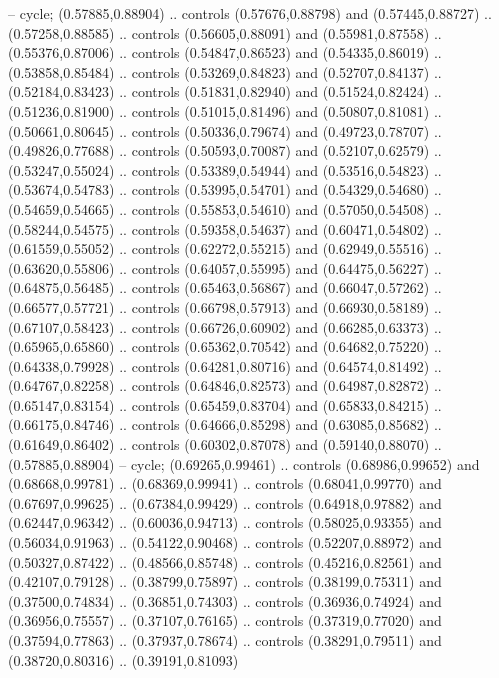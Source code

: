     -- cycle;
   (0.57885,0.88904)
    .. controls (0.57676,0.88798) and (0.57445,0.88727) .. (0.57258,0.88585)
    .. controls (0.56605,0.88091) and (0.55981,0.87558) .. (0.55376,0.87006)
    .. controls (0.54847,0.86523) and (0.54335,0.86019) .. (0.53858,0.85484)
    .. controls (0.53269,0.84823) and (0.52707,0.84137) .. (0.52184,0.83423)
    .. controls (0.51831,0.82940) and (0.51524,0.82424) .. (0.51236,0.81900)
    .. controls (0.51015,0.81496) and (0.50807,0.81081) .. (0.50661,0.80645)
    .. controls (0.50336,0.79674) and (0.49723,0.78707) .. (0.49826,0.77688)
    .. controls (0.50593,0.70087) and (0.52107,0.62579) .. (0.53247,0.55024)
    .. controls (0.53389,0.54944) and (0.53516,0.54823) .. (0.53674,0.54783)
    .. controls (0.53995,0.54701) and (0.54329,0.54680) .. (0.54659,0.54665)
    .. controls (0.55853,0.54610) and (0.57050,0.54508) .. (0.58244,0.54575)
    .. controls (0.59358,0.54637) and (0.60471,0.54802) .. (0.61559,0.55052)
    .. controls (0.62272,0.55215) and (0.62949,0.55516) .. (0.63620,0.55806)
    .. controls (0.64057,0.55995) and (0.64475,0.56227) .. (0.64875,0.56485)
    .. controls (0.65463,0.56867) and (0.66047,0.57262) .. (0.66577,0.57721)
    .. controls (0.66798,0.57913) and (0.66930,0.58189) .. (0.67107,0.58423)
    .. controls (0.66726,0.60902) and (0.66285,0.63373) .. (0.65965,0.65860)
    .. controls (0.65362,0.70542) and (0.64682,0.75220) .. (0.64338,0.79928)
    .. controls (0.64281,0.80716) and (0.64574,0.81492) .. (0.64767,0.82258)
    .. controls (0.64846,0.82573) and (0.64987,0.82872) .. (0.65147,0.83154)
    .. controls (0.65459,0.83704) and (0.65833,0.84215) .. (0.66175,0.84746)
    .. controls (0.64666,0.85298) and (0.63085,0.85682) .. (0.61649,0.86402)
    .. controls (0.60302,0.87078) and (0.59140,0.88070) .. (0.57885,0.88904)
    -- cycle;
   (0.69265,0.99461)
    .. controls (0.68986,0.99652) and (0.68668,0.99781) .. (0.68369,0.99941)
    .. controls (0.68041,0.99770) and (0.67697,0.99625) .. (0.67384,0.99429)
    .. controls (0.64918,0.97882) and (0.62447,0.96342) .. (0.60036,0.94713)
    .. controls (0.58025,0.93355) and (0.56034,0.91963) .. (0.54122,0.90468)
    .. controls (0.52207,0.88972) and (0.50327,0.87422) .. (0.48566,0.85748)
    .. controls (0.45216,0.82561) and (0.42107,0.79128) .. (0.38799,0.75897)
    .. controls (0.38199,0.75311) and (0.37500,0.74834) .. (0.36851,0.74303)
    .. controls (0.36936,0.74924) and (0.36956,0.75557) .. (0.37107,0.76165)
    .. controls (0.37319,0.77020) and (0.37594,0.77863) .. (0.37937,0.78674)
    .. controls (0.38291,0.79511) and (0.38720,0.80316) .. (0.39191,0.81093)
